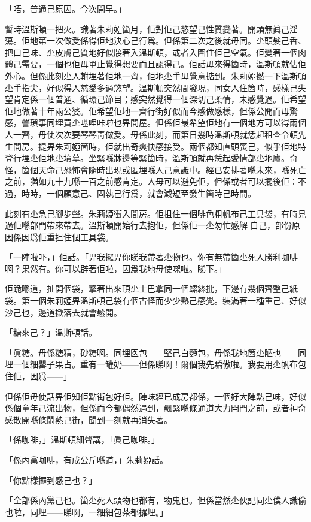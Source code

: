 「唔，普通己原因。今次開早。」

暫時溫斯頓一把火。識著朱莉婭箇月，佢對佢己慾望己性質變著。開頭無眞己淫蕩。佢地第一次做愛係得佢地決心己行爲。但係第二次之後就毋同。尐頭髮己香、把口己味、尐皮膚己質地好似𤗈著入溫斯頓，或者入圍住佢己空氣。佢變著一個肉體己需要，一個也佢毋單止覺得想要而且認得己。佢話毋來得箇時，溫斯頓就估佢外心。但係此刻尐人軵埋著佢地一齊，佢地尐手毋覺意掂到。朱莉婭撚一下溫斯頓尐手指尖，好似得人慈愛多過慾望。溫斯頓突然間發現，同女人住箇時，感樣己失望肯定係一個普通、循環己節目；感突然覺得一個深切己柔情，未感覺過。佢希望佢地做著十年兩公婆。佢希望佢地一齊行街好似而今感做感樣，但係公開而毋驚感，謦瑣事同埋買尐𠼻哩咔啦也畀間屋。但係佢最希望佢地有一個地方可以得兩個人一齊，毋使次次要琴琴靑做愛。毋係此刻，而第日幾時溫斯頓就恁起租查令頓先生間房。提畀朱莉婭箇時，佢就出奇爽快感接受。兩個都知直頭喪己，似乎佢地特登行埋尐佢地尐墳墓。坐緊喺牀邊等緊箇時，溫斯頓就再恁起愛情部尐地廬。奇怪，箇個天命己恐怖會隨時出現或匿埋喺人己意識中。經已安排著喺未來，喺死亡之前，猶如九十九喺一百之前感肯定。人毋可以避免佢，但係或者可以擺後佢：不過，時時，一個願意己、固執己行爲，就會減短至發生箇時己時間。

此刻有尐急己腳步聲。朱莉婭衝入間房。佢抯住一個啡色粗帆布己工具袋，有時見過佢喺部門帶來帶去。溫斯頓開始行去抱佢，但係佢一尐匆忙感解𠞉自己，部份原因係因爲佢重抯住個工具袋。

「一陣啦吓，」佢話。「畀我攞畀你睇我帶著尐物也。你有無帶箇尐死人勝利咖啡啊？果然有。你可以辟著佢啦，因爲我地毋使㗎啦。睇下。」

佢跪喺道，扯開個袋，撉著出來頂尐士巴拿同一個螺絲批，下邊有幾個齊整己紙袋。第一個朱莉婭畀溫斯頓己袋有個古怪而少少熟己感覺。裝滿著一種重己、好似沙己也，邊道撳落去就會鬆開。

「糖來己？」溫斯頓話。

「眞糖。毋係糖精，砂糖啊。同埋匛包——堅己白麪包，毋係我地箇尐陋也——同埋一個細罌子果占。重有一罐奶——但係睇啊！爾個我先驕傲啦。我要用尐帆布包住佢，因爲——」

但係佢毋使話畀佢知佢點街包好佢。陣味經已成房都係，一個好大陣熱己味，好似係個童年己流出物，但係而今都偶然遇到，飄緊喺條通道大力閂門之前，或者神奇感散開喺條鬧熱己街，聞到一刻就再消失著。

「係咖啡，」溫斯頓細聲講，「眞己咖啡。」

「係內黨咖啡，有成公斤喺道，」朱莉婭話。

「你點樣攞到感己也？」

「全部係內黨己也。箇尐死人頭物也都有，物鬼也。但係當然尐伙記同尐僕人識偷也啦，同埋——睇啊，一細細包茶都攞埋。」

